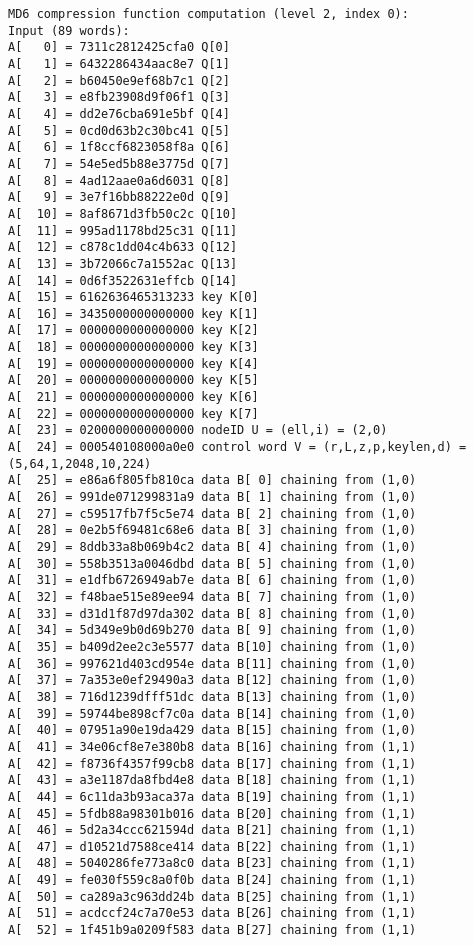 \begin{verbatim}
MD6 compression function computation (level 2, index 0):
Input (89 words):
A[   0] = 7311c2812425cfa0 Q[0]
A[   1] = 6432286434aac8e7 Q[1]
A[   2] = b60450e9ef68b7c1 Q[2]
A[   3] = e8fb23908d9f06f1 Q[3]
A[   4] = dd2e76cba691e5bf Q[4]
A[   5] = 0cd0d63b2c30bc41 Q[5]
A[   6] = 1f8ccf6823058f8a Q[6]
A[   7] = 54e5ed5b88e3775d Q[7]
A[   8] = 4ad12aae0a6d6031 Q[8]
A[   9] = 3e7f16bb88222e0d Q[9]
A[  10] = 8af8671d3fb50c2c Q[10]
A[  11] = 995ad1178bd25c31 Q[11]
A[  12] = c878c1dd04c4b633 Q[12]
A[  13] = 3b72066c7a1552ac Q[13]
A[  14] = 0d6f3522631effcb Q[14]
A[  15] = 6162636465313233 key K[0]
A[  16] = 3435000000000000 key K[1]
A[  17] = 0000000000000000 key K[2]
A[  18] = 0000000000000000 key K[3]
A[  19] = 0000000000000000 key K[4]
A[  20] = 0000000000000000 key K[5]
A[  21] = 0000000000000000 key K[6]
A[  22] = 0000000000000000 key K[7]
A[  23] = 0200000000000000 nodeID U = (ell,i) = (2,0)
A[  24] = 000540108000a0e0 control word V = (r,L,z,p,keylen,d) = (5,64,1,2048,10,224)
A[  25] = e86a6f805fb810ca data B[ 0] chaining from (1,0)
A[  26] = 991de071299831a9 data B[ 1] chaining from (1,0)
A[  27] = c59517fb7f5c5e74 data B[ 2] chaining from (1,0)
A[  28] = 0e2b5f69481c68e6 data B[ 3] chaining from (1,0)
A[  29] = 8ddb33a8b069b4c2 data B[ 4] chaining from (1,0)
A[  30] = 558b3513a0046dbd data B[ 5] chaining from (1,0)
A[  31] = e1dfb6726949ab7e data B[ 6] chaining from (1,0)
A[  32] = f48bae515e89ee94 data B[ 7] chaining from (1,0)
A[  33] = d31d1f87d97da302 data B[ 8] chaining from (1,0)
A[  34] = 5d349e9b0d69b270 data B[ 9] chaining from (1,0)
A[  35] = b409d2ee2c3e5577 data B[10] chaining from (1,0)
A[  36] = 997621d403cd954e data B[11] chaining from (1,0)
A[  37] = 7a353e0ef29490a3 data B[12] chaining from (1,0)
A[  38] = 716d1239dfff51dc data B[13] chaining from (1,0)
A[  39] = 59744be898cf7c0a data B[14] chaining from (1,0)
A[  40] = 07951a90e19da429 data B[15] chaining from (1,0)
A[  41] = 34e06cf8e7e380b8 data B[16] chaining from (1,1)
A[  42] = f8736f4357f99cb8 data B[17] chaining from (1,1)
A[  43] = a3e1187da8fbd4e8 data B[18] chaining from (1,1)
A[  44] = 6c11da3b93aca37a data B[19] chaining from (1,1)
A[  45] = 5fdb88a98301b016 data B[20] chaining from (1,1)
A[  46] = 5d2a34ccc621594d data B[21] chaining from (1,1)
A[  47] = d10521d7588ce414 data B[22] chaining from (1,1)
A[  48] = 5040286fe773a8c0 data B[23] chaining from (1,1)
A[  49] = fe030f559c8a0f0b data B[24] chaining from (1,1)
A[  50] = ca289a3c963dd24b data B[25] chaining from (1,1)
A[  51] = acdccf24c7a70e53 data B[26] chaining from (1,1)
A[  52] = 1f451b9a0209f583 data B[27] chaining from (1,1)

\end{verbatim}
